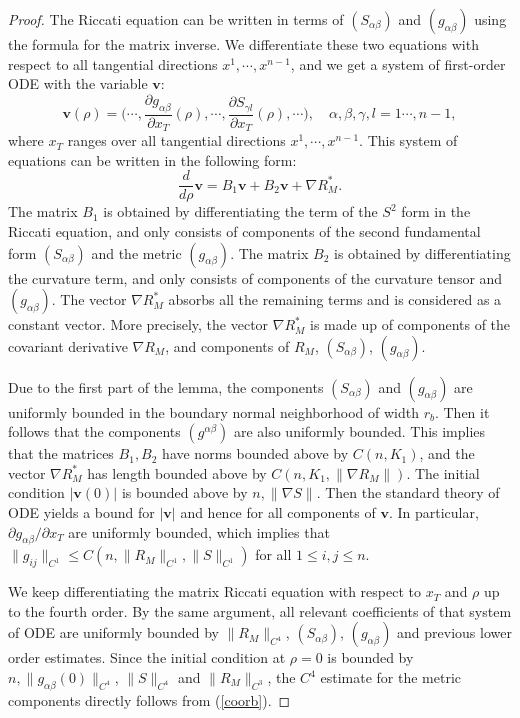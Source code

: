 \documentclass[11pt,letterpaper]{amsart}
\numberwithin{equation}{section}
\theoremstyle{definition}
\theoremstyle{plain}
\theoremstyle{definition}
\theoremstyle{plain}
\theoremstyle{definition}
\theoremstyle{plain}
\begin{document}
\begin{proof}
The Riccati equation can be written in terms of $(S_{\alpha\beta})$ and $(g_{\alpha\beta})$ using the formula for the matrix inverse. We differentiate these two equations with respect to all tangential directions $x^1,\cdots,x^{n-1}$, and we get a system of first-order ODE with the variable $\textbf{v}$:
$$\textbf{v}(\rho)=\big(\cdots,\frac{\partial g_{\alpha\beta}}{\partial x_T}(\rho),\cdots,\frac{\partial S_{\gamma l}}{\partial x_T}(\rho),\cdots \big), \quad \alpha,\beta,\gamma,l=1\cdots,n-1,$$
where $x_T$ ranges over all tangential directions $x^1,\cdots,x^{n-1}$. This system of equations can be written in the following form:
$$\frac{d}{d \rho} \textbf{v}=B_1\textbf{v}+B_2\textbf{v}+\nabla R_M^{\ast}.$$
The matrix $B_1$ is obtained by differentiating the term of the $S^2$ form in the Riccati equation, and only consists of components of the second fundamental form $(S_{\alpha\beta})$ and the metric $(g_{\alpha\beta})$. The matrix $B_2$ is obtained by differentiating the curvature term, and only consists of components of the curvature tensor and $(g_{\alpha\beta})$. The vector $\nabla R_M^{\ast}$ absorbs all the remaining terms and is considered as a constant vector. More precisely, the vector $\nabla R_M^{\ast}$ is made up of components of the covariant derivative $\nabla R_M$, and components of $R_M$, $(S_{\alpha\beta})$, $(g_{\alpha\beta})$.

Due to the first part of the lemma, the components $(S_{\alpha\beta})$ and $(g_{\alpha\beta})$ are uniformly bounded in the boundary normal neighborhood of width $r_b$. Then it follows that the components $(g^{\alpha\beta})$ are also uniformly bounded. This implies that the matrices $B_1,B_2$ have norms bounded above by $C(n,K_1)$, and the vector $\nabla R_M^{\ast}$ has length bounded above by $C(n,K_1,\|\nabla R_M\|)$. The initial condition $|\textbf{v}(0)|$ is bounded above by $n, \|\nabla S\|$. Then the standard theory of ODE yields a bound for $|\textbf{v}|$ and hence for all components of $\textbf{v}$. In particular, $\partial g_{\alpha\beta}/\partial x_T$ are uniformly bounded, which implies that $\|g_{ij}\|_{C^1}\leqslant C(n,\|R_M\|_{C^1},\|S\|_{C^1})$ for all $1\leqslant i,j\leqslant n$.

We keep differentiating the matrix Riccati equation with respect to $x_T$ and $\rho$ up to the fourth order. By the same argument, all relevant coefficients of that system of ODE are uniformly bounded by $\|R_M\|_{C^4}$, $(S_{\alpha\beta})$, $(g_{\alpha\beta})$ and previous lower order estimates. Since the initial condition at $\rho=0$ is bounded by $n, \|g_{\alpha\beta}(0)\|_{C^4}$, $\|S\|_{C^4}$ and $\|R_M\|_{C^3}$, the $C^4$ estimate for the metric components directly follows from (\ref{coorb}).
\end{proof}
\end{document}
